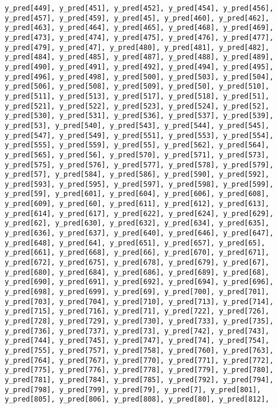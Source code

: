 \documentclass[
  letterpaper,
  DIV=11,
  numbers=noendperiod]{scrartcl}
\begin{document}
\begin{verbatim}
y_pred[449], y_pred[451], y_pred[452], y_pred[454], y_pred[456],
y_pred[457], y_pred[459], y_pred[45], y_pred[460], y_pred[462],
y_pred[463], y_pred[464], y_pred[465], y_pred[468], y_pred[469],
y_pred[473], y_pred[474], y_pred[475], y_pred[476], y_pred[477],
y_pred[479], y_pred[47], y_pred[480], y_pred[481], y_pred[482],
y_pred[484], y_pred[485], y_pred[487], y_pred[488], y_pred[489],
y_pred[490], y_pred[491], y_pred[492], y_pred[494], y_pred[495],
y_pred[496], y_pred[498], y_pred[500], y_pred[503], y_pred[504],
y_pred[506], y_pred[508], y_pred[509], y_pred[50], y_pred[510],
y_pred[511], y_pred[513], y_pred[517], y_pred[518], y_pred[51],
y_pred[521], y_pred[522], y_pred[523], y_pred[524], y_pred[52],
y_pred[530], y_pred[531], y_pred[536], y_pred[537], y_pred[539],
y_pred[53], y_pred[540], y_pred[543], y_pred[544], y_pred[545],
y_pred[547], y_pred[549], y_pred[551], y_pred[553], y_pred[554],
y_pred[555], y_pred[559], y_pred[55], y_pred[562], y_pred[564],
y_pred[565], y_pred[56], y_pred[570], y_pred[571], y_pred[573],
y_pred[575], y_pred[576], y_pred[577], y_pred[578], y_pred[579],
y_pred[57], y_pred[584], y_pred[586], y_pred[590], y_pred[592],
y_pred[593], y_pred[595], y_pred[597], y_pred[598], y_pred[599],
y_pred[59], y_pred[601], y_pred[604], y_pred[606], y_pred[608],
y_pred[609], y_pred[60], y_pred[611], y_pred[612], y_pred[613],
y_pred[614], y_pred[617], y_pred[622], y_pred[624], y_pred[629],
y_pred[62], y_pred[630], y_pred[632], y_pred[634], y_pred[635],
y_pred[636], y_pred[637], y_pred[640], y_pred[646], y_pred[647],
y_pred[648], y_pred[64], y_pred[651], y_pred[657], y_pred[65],
y_pred[661], y_pred[668], y_pred[66], y_pred[670], y_pred[671],
y_pred[672], y_pred[675], y_pred[678], y_pred[679], y_pred[67],
y_pred[680], y_pred[684], y_pred[686], y_pred[689], y_pred[68],
y_pred[690], y_pred[691], y_pred[692], y_pred[694], y_pred[696],
y_pred[698], y_pred[699], y_pred[69], y_pred[700], y_pred[701],
y_pred[703], y_pred[704], y_pred[710], y_pred[713], y_pred[714],
y_pred[715], y_pred[716], y_pred[71], y_pred[722], y_pred[726],
y_pred[728], y_pred[729], y_pred[730], y_pred[733], y_pred[735],
y_pred[736], y_pred[737], y_pred[73], y_pred[742], y_pred[743],
y_pred[744], y_pred[745], y_pred[747], y_pred[74], y_pred[754],
y_pred[755], y_pred[757], y_pred[758], y_pred[760], y_pred[763],
y_pred[764], y_pred[767], y_pred[770], y_pred[771], y_pred[772],
y_pred[775], y_pred[776], y_pred[778], y_pred[779], y_pred[780],
y_pred[781], y_pred[784], y_pred[785], y_pred[792], y_pred[794],
y_pred[798], y_pred[799], y_pred[79], y_pred[7], y_pred[801],
y_pred[805], y_pred[806], y_pred[808], y_pred[80], y_pred[812],

\end{verbatim}
\end{document}
